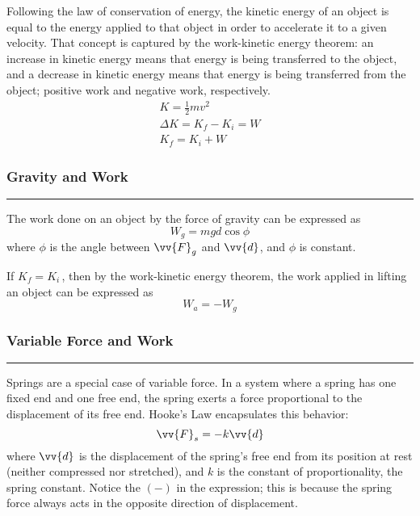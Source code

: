 \documentclass{article}
\begin{document}
    \medskip\noindent
    Following the law of conservation of energy, the kinetic energy of an object is equal to the energy applied to that object in order to accelerate it to a given velocity.
    That concept is captured by the work-kinetic energy theorem: an increase in kinetic energy means that energy is being transferred to the object, and a decrease in kinetic energy means that energy is being transferred from the object; positive work and negative work, respectively.
    \begin{gather*}
        K=\frac{1}{2}mv^2                   \\
        \Delta K = K_f - K_i = W            \\[.3em]
        K_f = K_i + W
    \end{gather*}

    \smallskip
    \subsubsection*{Gravity and Work}
    \vspace{-1em}
    \rule{\linewidth}{.1mm}

    \smallskip\noindent
    The work done on an object by the force of gravity can be expressed as
    \[
        W_g = mgd\cos\phi
    \]
    \noindent
    where $\phi$ is the angle between $\vv{F}_g$ and $\vv{d}$, and $\phi$ is constant.

    \medskip\noindent
    If $K_f=K_i$\,, then by the work-kinetic energy theorem, the work applied in lifting an object can be expressed as
    \[
        W_a = -W_g
    \]

    \smallskip
    \subsubsection*{Variable Force and Work}
    \vspace{-1em}
    \rule{\linewidth}{.1mm}

    \smallskip\noindent
    Springs are a special case of variable force.
    In a system where a spring has one fixed end and one free end, the spring exerts a force proportional to the displacement of its free end.
    Hooke's Law encapsulates this behavior:
    \[
        \vv{F}_s=-k\vv{d}
    \]
    \noindent
    where $\vv{d}$ is the displacement of the spring's free end from its position at rest (neither compressed nor stretched), and $k$ is the constant of proportionality, the spring constant.
    Notice the $(-)$ in the expression; this is because the spring force always acts in the opposite direction of displacement.
\end{document}

